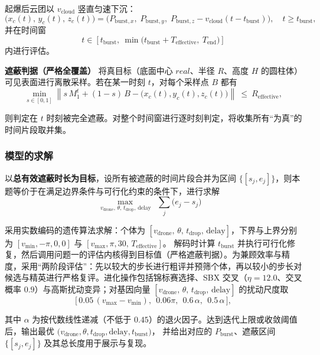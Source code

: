 \documentclass[withoutpreface,bwprint]{cumcmthesis} %
\begin{document}
起爆后云团以 $v_{\text{cloud}}$ 竖直匀速下沉：
\begin{equation}
	\big(x_c(t),\,y_c(t),\,z_c(t)\big)
	=
	\big(P_{\text{burst},x},\;P_{\text{burst},y},\;P_{\text{burst},z}-v_{\text{cloud}}(t-t_{\text{burst}})\big),
	\quad t\ge t_{\text{burst}},
\end{equation}
并在时间窗
\begin{equation}
	t\in\left[t_{\text{burst}},\ \min\!\big(t_{\text{burst}}+T_{\text{effective}},\ T_{\text{end}}\big)\right]
\end{equation}
内进行评估。

\textbf{遮蔽判据（严格全覆盖）}
将真目标（底面中心 $real$、半径 $R$、高度 $H$ 的圆柱体）可见表面进行离散采样。若在某一时刻 $t$，对每个采样点 $B$ 都有
\begin{equation}
	\min_{s\in[0,1]}
	\left\|
	s\,M_1^{t}+(1-s)\,B
	-\big(x_c(t),y_c(t),z_c(t)\big)
	\right\|
	\ \le\ R_{\text{effective}},
\end{equation}

则判定在 $t$ 时刻被完全遮蔽。对整个时间窗进行逐时刻判定，将收集所有“为真”的时间片段取并集。

\subsubsection{模型的求解}
以\textbf{总有效遮蔽时长为目标}，设所有被遮蔽的时间片段合并为区间 $\{[s_j,e_j]\}$，则本题等价于在满足边界条件与可行化约束的条件下，进行求解
\begin{equation}
	\max_{\,v_{\text{drone}},\,\theta,\,t_{\text{drop}},\,\text{delay}}
	\ \ \sum_{j}\big(e_j-s_j\big)
	\quad
	\text{}
\end{equation}

采用实数编码的遗传算法求解：个体为 $[v_{\text{drone}},\,\theta,\,t_{\text{drop}},\,\text{delay}]$，下界与上界分别为
$[v_{\min},-\pi,0,0]$ 与 $[v_{\max},\pi,30,\,T_{\text{effective}}]$。
解码时计算 $t_{\text{burst}}$ 并执行可行化修复，然后调用问题一的评估内核得到目标值（严格遮蔽判据）。为兼顾效率与精度，采用“两阶段评估”：先以较大的步长进行粗评并预筛个体，再以较小的步长对候选与精英进行严格复评。进化操作包括锦标赛选择、SBX 交叉（$\eta=12.0$、交叉概率 $0.9$）与高斯扰动变异；对基因向量
$[v_{\text{drone}},\,\theta,\,t_{\text{drop}},\,\text{delay}]$
的扰动尺度取
\[
\big[\,0.05\,(v_{\max}-v_{\min}),\ \ 0.06\pi,\ \ 0.6\,\alpha,\ \ 0.5\,\alpha\,\big],
\]

其中 $\alpha$ 为按代数线性递减（不低于 $0.45$）的退火因子。达到迭代上限或收敛阈值后，输出最优
$\big(v_{\text{drone}},\theta,t_{\text{drop}},\text{delay},t_{\text{burst}}\big)$，
并给出对应的 $P_{\text{burst}}$、遮蔽区间 $\{[s_j,e_j]\}$ 及其总长度用于展示与复现。
\end{document}
